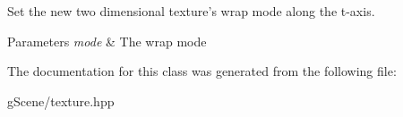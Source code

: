 Set the new two dimensional texture's wrap mode along the t-\/axis. 


\begin{DoxyParams}{Parameters}
{\em mode} & The wrap mode \\
\hline
\end{DoxyParams}


The documentation for this class was generated from the following file\-:\begin{DoxyCompactItemize}
\item 
g\-Scene/texture.\-hpp\end{DoxyCompactItemize}
